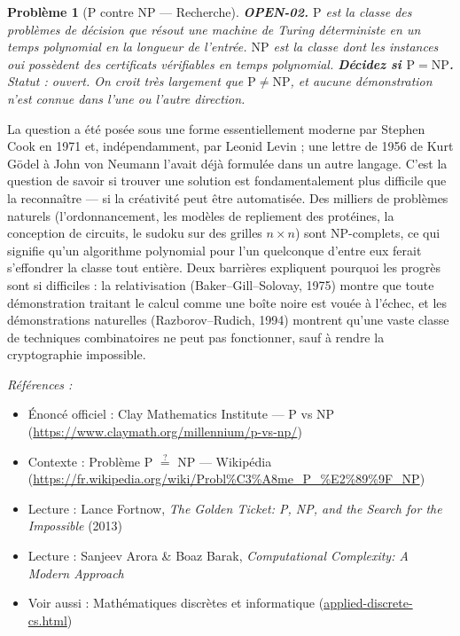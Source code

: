 \documentclass[11pt]{article}
\newtheorem{problem}{Problème}
\newenvironment{refs}{\par\small\noindent\emph{Références :}\begin{itemize}\setlength\itemsep{0pt}}{\end{itemize}\normalsize}
\begin{document}
\bigskip

\begin{problem}[{P contre NP --- Recherche}]
\textbf{OPEN-02.} $ \mathrm{P} $ est la classe des problèmes de
décision que résout une machine de Turing déterministe en un temps polynomial en la
longueur de l'entrée. $ \mathrm{NP} $ est la classe dont les instances \og{} oui \fg{}
possèdent des certificats vérifiables en temps polynomial. \textbf{Décidez si
$ \mathrm{P} = \mathrm{NP} $.} Statut : ouvert. On croit très largement que
$ \mathrm{P} \neq \mathrm{NP} $, et aucune démonstration n'est connue dans l'une ou
l'autre direction.
\end{problem}

\noindent La question a été posée sous une forme essentiellement moderne par
Stephen Cook en 1971 et, indépendamment, par Leonid Levin ; une lettre de 1956 de Kurt
Gödel à John von Neumann l'avait déjà formulée dans un autre langage. C'est la question
de savoir si trouver une solution est fondamentalement plus difficile que la reconnaître
--- si la créativité peut être automatisée. Des milliers de problèmes naturels
(l'ordonnancement, les modèles de repliement des protéines, la conception de circuits, le
sudoku sur des grilles $ n \times n $) sont NP-complets, ce qui signifie qu'un
algorithme polynomial pour l'un quelconque d'entre eux ferait s'effondrer la classe tout
entière. Deux barrières expliquent pourquoi les progrès sont si difficiles : la
relativisation (Baker--Gill--Solovay, 1975) montre que toute démonstration traitant le
calcul comme une boîte noire est vouée à l'échec, et les démonstrations naturelles
(Razborov--Rudich, 1994) montrent qu'une vaste classe de techniques combinatoires ne peut
pas fonctionner, sauf à rendre la cryptographie impossible.

\begin{refs}
\item Énoncé officiel : Clay Mathematics Institute --- P vs NP (\url{https://www.claymath.org/millennium/p-vs-np/})
\item Contexte : Problème P $\stackrel{?}{=}$ NP --- Wikipédia (\url{https://fr.wikipedia.org/wiki/Probl%C3%A8me_P_%E2%89%9F_NP})
\item Lecture : Lance Fortnow, \textit{The Golden Ticket: P, NP, and the Search for the Impossible} (2013)
\item Lecture : Sanjeev Arora \& Boaz Barak, \textit{Computational Complexity: A Modern Approach}
\item Voir aussi : Mathématiques discrètes et informatique (\url{applied-discrete-cs.html})
\end{refs}
\end{document}
